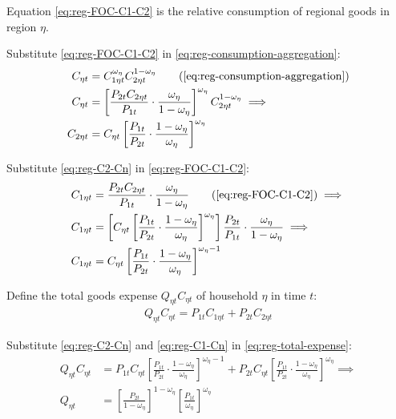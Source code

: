 \documentclass[
thesis.tex
]{subfiles}
\begin{document}
Equation \ref{eq:reg-FOC-C1-C2} is the relative consumption of regional goods in region $\eta$.

Substitute \ref{eq:reg-FOC-C1-C2} in \ref{eq:reg-consumption-aggregation}:
\begin{align}
	C_{\eta t} &= C_{1\eta t}^{\omega_{\eta}} C_{2\eta t}^{1-\omega_{\eta}} \tag{\ref{eq:reg-consumption-aggregation}} \\
	C_{\eta t} &= \left[ \frac{P_{2t} C_{2\eta t}}{P_{1t}} \cdot \frac{\omega_{\eta}}{1 -\omega_{\eta}} \right]^{\omega_{\eta}} C_{2\eta t}^{1-\omega_{\eta}} \implies \nonumber \\
	C_{2\eta t} &= C_{\eta t} \left[ \frac{P_{1t} }{P_{2t}} \cdot \frac{1 -\omega_{\eta}}{\omega_{\eta}} \right]^{\omega_{\eta}} \label{eq:reg-C2-Cn}
\end{align}

Substitute \ref{eq:reg-C2-Cn} in \ref{eq:reg-FOC-C1-C2}:
\begin{align}
	C_{1\eta t} &= \frac{P_{2t} C_{2\eta t}}{P_{1t}} \cdot \frac{\omega_{\eta}}{1 -\omega_{\eta}} \tag{\ref{eq:reg-FOC-C1-C2}} \implies \nonumber \\
	C_{1\eta t} &= \left[ C_{\eta t} \left[ \frac{P_{1t} }{P_{2t}} \cdot \frac{1 -\omega_{\eta}}{\omega_{\eta}} \right]^{\omega_{\eta}} \right] \frac{P_{2t}}{P_{1t}} \cdot \frac{\omega_{\eta}}{1 -\omega_{\eta}} \implies \nonumber \\
	C_{1\eta t} &= C_{\eta t} \left[ \frac{P_{1t} }{P_{2t}} \cdot \frac{1 -\omega_{\eta}}{\omega_{\eta}} \right]^{\omega_{\eta} -1} \label{eq:reg-C1-Cn}
\end{align}

Define the total goods expense $Q_{\eta t} C_{\eta t}$ of household $\eta$ in time $t$:
\begin{align}
	Q_{\eta t} C_{\eta t} = P_{1 t} C_{1\eta t} + P_{2 t} C_{2\eta t} \label{eq:reg-total-expense}
\end{align}

Substitute \ref{eq:reg-C2-Cn} and \ref{eq:reg-C1-Cn} in \ref{eq:reg-total-expense}:
\begin{align}
	Q_{\eta t} C_{\eta t} &= P_{1 t} C_{\eta t} \left[ \frac{P_{1t} }{P_{2t}} \cdot \frac{1 -\omega_{\eta}}{\omega_{\eta}} \right]^{\omega_{\eta} -1} + P_{2 t} C_{\eta t} \left[ \frac{P_{1t} }{P_{2t}} \cdot \frac{1 -\omega_{\eta}}{\omega_{\eta}} \right]^{\omega_{\eta}} \implies \nonumber \\
	Q_{\eta t} &= \left[ \frac{P_{2t}}{1 -\omega_{\eta}} \right]^{1 -\omega_{\eta}} \left[ \frac{P_{1t}}{\omega_{\eta}} \right]^{\omega_{\eta}} \label{eq:reg-price-eta-level}
\end{align}
\end{document}
